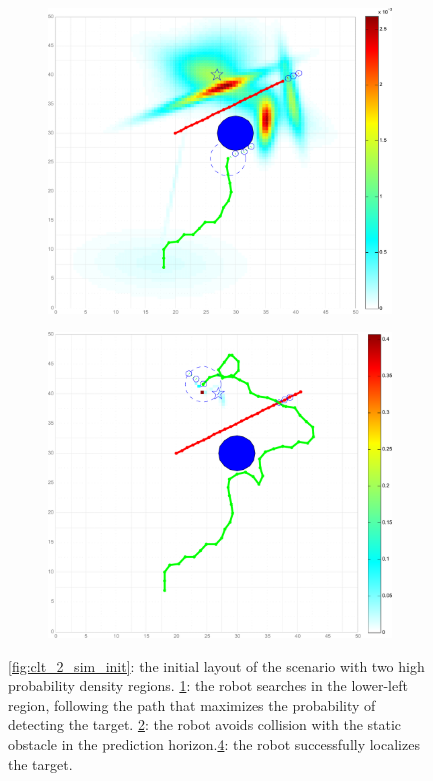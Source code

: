 \documentclass[twocolumn,10pt]{asme2e}
\begin{document}
\begin{figure}
\begin{subfigure}[b]{0.2\textwidth}
		\caption{}\label{fig:clt_2_sim_leave_clt}
	\end{subfigure}
	\begin{subfigure}[b]{0.2\textwidth}
		\includegraphics[width=\textwidth]{figures/clt_2_sim3_avoid_ob_1_newcm1}
		\caption{}\label{fig:clt_2_sim_avoid_ob}
	\end{subfigure}
	\begin{subfigure}[b]{0.2\textwidth}
		\includegraphics[width=\textwidth]{figures/clt_2_sim3_end_newcm1}
		\caption{}\label{fig:clt_2_sim_end}
	\end{subfigure}
	\caption{\cref{fig:clt_2_sim_init}: the initial layout of the scenario with two high probability density regions. \cref{fig:clt_2_sim_leave_clt}: the robot searches in the lower-left region, following the path that maximizes the probability of detecting the target. \cref{fig:clt_2_sim_avoid_ob}: the robot avoids collision with the static obstacle in the prediction horizon.\cref{fig:clt_2_sim_end}: the robot successfully localizes the target.}
\end{figure}
\end{document}
